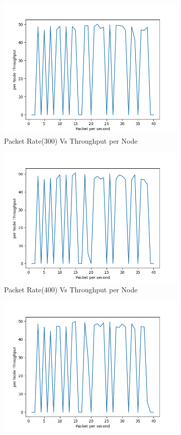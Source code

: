 \begin{figure}[h]
\begin{subfigure}{.5\textwidth}
    \includegraphics[width=.8\linewidth]{_11_2_mobile/Packetpersecond(300)vsperNodeThroughput.png}
         \caption{Packet Rate(300) Vs Throughput per Node}
        \end{subfigure}
\begin{subfigure}{.5\textwidth}
    \centering
    \includegraphics[width=.8\linewidth]{_11_2_mobile/Packetpersecond(400)vsperNodeThroughput.png}
         \caption{Packet Rate(400) Vs Throughput per Node}
        \end{subfigure}
\begin{subfigure}{.5\textwidth}
    \centering
    \includegraphics[width=.8\linewidth]{_11_2_mobile/Packetpersecond(500)vsperNodeThroughput.png}

\end{subfigure}
\end{figure}

